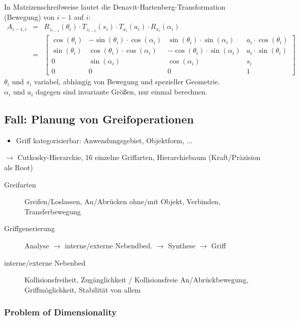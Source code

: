 In Matrizenschreibweise lautet die Denavit-Hartenberg-Transformation (Bewegung) von $i-1$ auf $i$:
\begin{eqnarray*}
A_{i-1,i} &=& R_{z_{i-1}}(\theta_i) \cdot T_{z_{i-1}}(s_i) \cdot T_{x_i}(a_i) \cdot R_{x_i}(\alpha_i) \\
&=& \left[ \begin{array}{cccc} \cos(\theta_i) & - \sin(\theta_i) \cdot \cos(\alpha_i) & \sin(\theta_i) \cdot \sin(\alpha_i) & a_i \cdot \cos(\theta_i) \\ \sin(\theta_i) & \cos(\theta_i) \cdot \cos(\alpha_i) & - \cos(\theta_i) \cdot \sin(\alpha_i) & a_i \cdot \sin(\theta_i) \\ 0 & \sin(\alpha_i) & \cos(\alpha_i) & s_i \\ 0 & 0 & 0 & 1 \end{array} \right]
\end{eqnarray*}
$\theta_i$ und $s_i$ variabel, abhängig von Bewegung und spezieller Geometrie. \\ $\alpha_i$ und $a_i$ dagegen sind invariante Größen, nur einmal berechnen.

\subsection{Fall: Planung von Greifoperationen}

\begin{itemize}
	\item Griff kategorisierbar: Anwendungsgebiet, Objektform, $\dots$
\end{itemize}
$\rightarrow$ Cutkosky-Hierarchie, 16 einzelne Griffarten, Hierarchiebaum (Kraft/Präzision als Root)

\begin{description}
	\item[Greifarten] Greifen/Loslassen, An/Abrücken ohne/mit Objekt, Verbinden, Transferbewegung
	\item[Griffgenerierung] Analyse $\to$ interne/externe Nebendbed. $\to$ Synthese $\to$ Griff
	\item[interne/externe Nebenbed] Kollisionsfreiheit, Zugänglichkeit / Kollisionsfreie An/Abrückbewegung, Griffmöglichkeit, Stabilität von allem
\end{description}

\subsubsection{Problem of Dimensionality}

